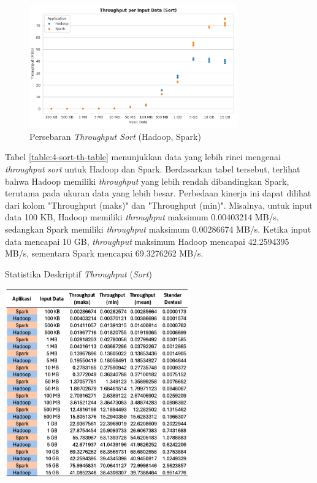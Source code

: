 \begin{figure}[h]
    \centering
    \includegraphics[width=0.8\textwidth]{figures/ch04/1-throughput-sort.png}
    \caption{Persebaran \textit{Throughput Sort} (Hadoop, Spark)}
    \label{fig:throughput-sort}
\end{figure}

Tabel \ref{table:4-sort-th-table} menunjukkan data yang lebih rinci mengenai \textit{throughput} \textit{sort} untuk Hadoop dan Spark. Berdasarkan tabel tersebut, terlihat bahwa Hadoop memiliki \textit{throughput} yang lebih rendah dibandingkan Spark, terutama pada ukuran data yang lebih besar.
Perbedaan kinerja ini dapat dilihat dari kolom "Throughput (maks)" dan "Throughput (min)". Misalnya, untuk input data 100 KB, Hadoop memiliki \textit{throughput} maksimum 0.00403214 MB/s, sedangkan Spark memiliki \textit{throughput} maksimum 0.00286674 MB/s. Ketika input data mencapai 10 GB, \textit{throughput} maksimum Hadoop mencapai 42.2594395 MB/s, sementara Spark mencapai 69.3276262 MB/s. 

\begin{table}[h]
  \centering
  \caption{Statistika Deskriptif \textit{Throughput} (\textit{Sort})}
  \includegraphics[width=0.6\textwidth]{figures/ch04/4-sort-th-table}
  \label{table:4-sort-th-table}
\end{table}

